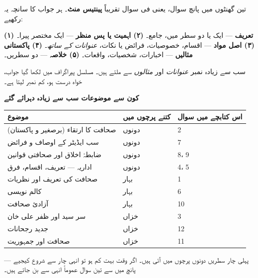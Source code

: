 \medskip
\begin{nukta}
تین گھنٹوں میں پانچ سوال، یعنی فی سوال تقریباً \textbf{پینتیس منٹ}۔ ہر جواب کا
سانچہ یہ رکھیے:

\smallskip
\textbf{(۱) تعریف} --- ایک یا دو سطر میں، جامع۔ \quad
\textbf{(۲) اہمیت یا پس منظر} --- ایک مختصر پیرا۔ \quad
\textbf{(۳) اصل مواد} --- اقسام، خصوصیات، فرائض یا نکات، \emph{عنوانات کے
ساتھ}۔ \quad
\textbf{(۴) پاکستانی مثالیں} --- اخبارات، شخصیات، واقعات۔ \quad
\textbf{(۵) خلاصہ} --- دو سطریں۔

\smallskip
سب سے زیادہ نمبر \emph{عنوانات} اور \emph{مثالوں} سے ملتے ہیں۔ مسلسل پیراگراف
میں لکھا گیا جواب، خواہ درست ہو، کم نمبر لیتا ہے۔
\end{nukta}

\medskip
\noindent
\textbf{\color{bmblue}کون سے موضوعات سب سے زیادہ دہرائے گئے}

\medskip
\begin{center}
\begin{tabular}{@{}p{6.4cm} p{2.6cm} p{5.4cm}@{}}
\toprule
\textbf{موضوع} & \textbf{کتنے پرچوں میں} & \textbf{اس کتابچے میں سوال} \\
\midrule
صحافت کا ارتقاء (برصغیر و پاکستان) & دونوں & \textenglish{2} \\
سب ایڈیٹر کے اوصاف و فرائض        & دونوں & \textenglish{7} \\
ضابطۂ اخلاق اور صحافتی قوانین      & دونوں & \textenglish{8}، \textenglish{9} \\
اداریہ --- تعریف، اقسام، فرق       & دونوں & \textenglish{4}، \textenglish{5} \\
صحافت کی تعریف اور نظریات          & بہار  & \textenglish{1} \\
کالم نویسی                          & بہار  & \textenglish{6} \\
آزادیٔ صحافت                        & بہار  & \textenglish{10} \\
سر سید اور ظفر علی خان              & خزاں  & \textenglish{3} \\
جدید رجحانات                        & خزاں  & \textenglish{12} \\
صحافت اور جمہوریت                   & خزاں  & \textenglish{11} \\
\bottomrule
\end{tabular}
\end{center}

\medskip
\noindent
پہلی چار سطریں دونوں پرچوں میں آئی ہیں۔ اگر وقت بہت کم ہو تو انہی چار سے شروع
کیجیے --- پانچ میں سے تین سوال عموماً انہی سے بن جاتے ہیں۔
